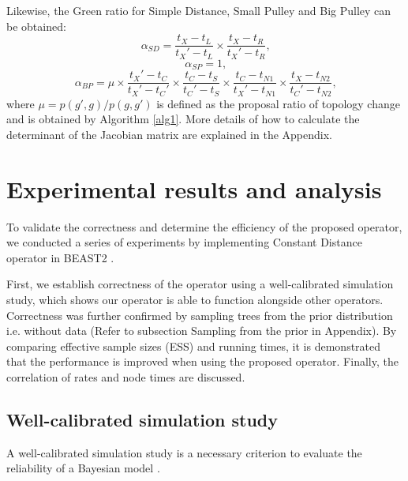\documentclass{bmcart}
\begin{document}
Likewise, the Green ratio for Simple Distance, Small Pulley and  Big Pulley can be obtained: 
\begin{equation}\label{HR2}
{\alpha_{SD}} = \frac{{{t_X} - {t_L}}}{{{t_X}' - {t_L}}} \times \frac{{{t_X} - {t_R}}}{{{t_X}' - {t_R}}}\text{,}
\end{equation}
\begin{equation}\label{HR3}
{\alpha_{SP}}  = 1\text{,}
\end{equation}
\begin{equation}\label{HR4}
{\alpha_{BP}} = \mu \times \frac{{{t_X}' - {t_C}}}{{{t_X}' - {t_C}'}} \times \frac{{{t_C} - {t_S}}}{{{t_C}' - {t_S}}} \times \frac{{{t_C} - {t_{N1}}}}{{{t_X}' - {t_{N1}}}} \times \frac{{{t_X} - {t_{N2}}}}{{{t_C}' - {t_{N2}}}}\text{,}
\end{equation}
where $\mu = p(g', g) / p(g, g')$ is defined as the proposal ratio of topology change and is obtained by Algorithm \ref{alg1}. More details of how to calculate the determinant of the Jacobian matrix are explained in the Appendix. 

\section*{Experimental results and analysis}
To validate the correctness and determine the efficiency of the proposed operator, we conducted a series of experiments by implementing Constant Distance operator in BEAST2 \cite{bouckaert2014beast}.

First, we establish correctness of the operator using a well-calibrated simulation study, which shows our operator is able to function alongside other operators. Correctness was further confirmed by sampling trees from the prior distribution i.e. without data (Refer to subsection Sampling from the prior in Appendix). By comparing effective sample sizes (ESS) \cite{Tracer} and running times, it is demonstrated that the performance is improved when using the proposed operator. Finally, the correlation of rates and node times are discussed.

\subsection*{Well-calibrated simulation study}
A well-calibrated simulation study is a necessary criterion to evaluate the reliability of a Bayesian model \cite{dawid1982well}. 
\end{document}

